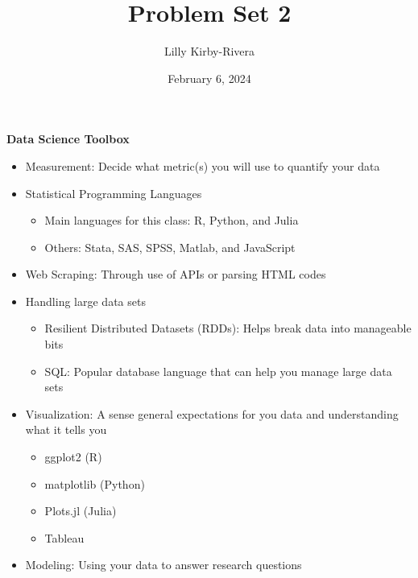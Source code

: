 \documentclass{article}
\title{Problem Set 2}
\author{Lilly Kirby-Rivera}
\date{February 6, 2024}
\begin{document}
\maketitle
\textbf{Data Science Toolbox}
\begin{itemize}
    \item Measurement: Decide what metric(s) you will use to quantify your data
    \item Statistical Programming Languages
    \begin{itemize}
        \item Main languages for this class: R, Python, and Julia
        \item Others: Stata, SAS, SPSS, Matlab, and JavaScript
    \end{itemize}
    \item Web Scraping: Through use of APIs or parsing HTML codes
    \item Handling large data sets
    \begin{itemize}
        \item Resilient Distributed Datasets (RDDs): Helps break data into manageable bits
        \item SQL: Popular database language that can help you manage large data sets
    \end{itemize}
    \item Visualization: A sense general expectations for you data and understanding what it tells you
    \begin{itemize}
        \item ggplot2 (R)
        \item matplotlib (Python)
        \item Plots.jl (Julia)
        \item Tableau
    \end{itemize}
    \item Modeling: Using your data to answer research questions
\end{itemize}
\end{document}
